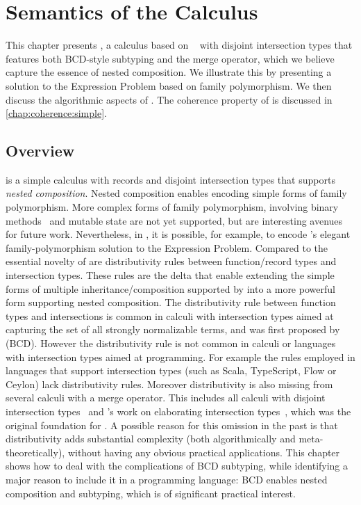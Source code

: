 
\chapter{Semantics of the \namee Calculus}
\label{chap:nested}

This chapter presents \namee, a calculus based on \oname~\citep{oliveira2016disjoint} with disjoint intersection types that
features both BCD-style subtyping and the merge operator, which we believe
capture the essence of nested composition. We illustrate this by presenting a
solution to the Expression Problem based on family polymorphism. We then discuss
the algorithmic aspects of \namee. The coherence property of \namee is discussed
in \cref{chap:coherence:simple}.

\section{Overview}

\namee is a simple calculus with records and disjoint intersection types that
supports \emph{nested composition}. Nested composition enables encoding simple
forms of family polymorphism. More complex forms of family polymorphism,
involving binary methods~\citep{bruce1995binary} and mutable state are not yet
supported, but are interesting avenues for future work. Nevertheless, in \namee,
it is possible, for example, to encode \citeauthor{Ernst_2001}'s elegant family-polymorphism
solution to the Expression Problem. Compared to \oname the essential novelty of
\namee are distributivity rules between function/record types and intersection
types. These rules are the delta that enable extending the simple forms of
multiple inheritance/composition supported by \oname into a more powerful form
supporting nested composition. The distributivity rule between function types
and intersections is common in calculi with intersection types aimed at
capturing the set of all strongly normalizable terms, and was first proposed by
\citet{Barendregt_1983} (BCD). However the distributivity rule is not common in
calculi or languages with intersection types aimed at programming. For example
the rules employed in languages that support intersection types (such as Scala,
TypeScript, Flow or Ceylon) lack distributivity rules. Moreover distributivity
is also missing from several calculi with a merge operator. This includes all
calculi with disjoint intersection types~\citep{oliveira2016disjoint,
  alpuimdisjoint} and \citeauthor{dunfield2014elaborating}'s work on elaborating
intersection types~\citep{dunfield2014elaborating}, which was the original
foundation for \oname. A possible reason for this omission in the past is that
distributivity adds substantial complexity (both algorithmically and
meta-theoretically), without having any obvious practical applications. This
chapter shows how to deal with the complications of BCD subtyping, while
identifying a major reason to include it in a programming language: BCD enables
nested composition and subtyping, which is of significant practical interest.

